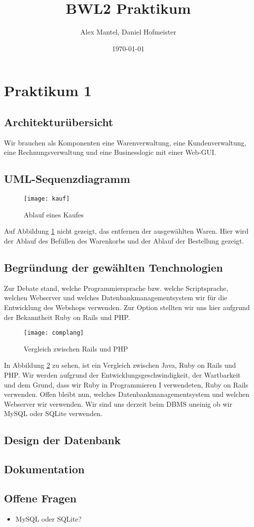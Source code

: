 \documentclass[pdftex,10pt,a4paper]{article}
\begin{document}
\title{BWL2 Praktikum}
\author{Alex Mantel, Daniel Hofmeister}
\date{\today}
\maketitle

\section{Praktikum 1}
\subsection{Architektur\"ubersicht}
Wir brauchen als Komponenten eine Warenverwaltung, eine Kundenverwaltung, eine Rechnungsverwaltung und eine Businesslogic mit einer Web-GUI.

\subsection{UML-Sequenzdiagramm}
\begin{figure}[h]
	\caption{Ablauf eines Kaufes}
	\label{fig:kauf}
	\texttt{[image: kauf]}
\end{figure}				
Auf Abbildung \ref{fig:kauf} nicht gezeigt, das entfernen der ausgew\"ahlten Waren. Hier wird der Ablauf des Bef\"ullen des Warenkorbs und der Ablauf der Bestellung gezeigt.

\subsection{Begr\"undung der gew\"ahlten Tenchnologien}
Zur Debate stand, welche Programmiersprache bzw. welche Scriptsprache, welchen Webserver und welches Datenbankmanagementsystem wir f\"ur die Entwicklung des Webshops verwenden. Zur Option stellten wir uns hier aufgrund der Bekanntheit Ruby on Rails und PHP.

\begin{figure}[h]
	\caption{Vergleich zwischen Rails und PHP}
	\cite{tbray}
	\label{fig:vergleich}
	\texttt{[image: complang]}
\end{figure}

In Abbildung \ref{fig:vergleich} zu sehen, ist ein Vergleich zwischen Java, Ruby on Rails und PHP. Wir werden aufgrund der Entwicklungsgeschwindigkeit, der Wartbarkeit und dem Grund, dass wir Ruby in Programmieren I verwendeten, Ruby on Rails verwenden. Offen bleibt nun, welches Datenbankmanagementsystem und welchen Webserver wir verwenden. Wir sind uns derzeit beim DBMS uneinig ob wir MySQL oder SQLite verwenden.

\subsection{Design der Datenbank}

\subsection{Dokumentation}

\subsection{Offene Fragen}
\begin{itemize}
	\item MySQL oder SQLite?
\end{itemize}



\end{document}
